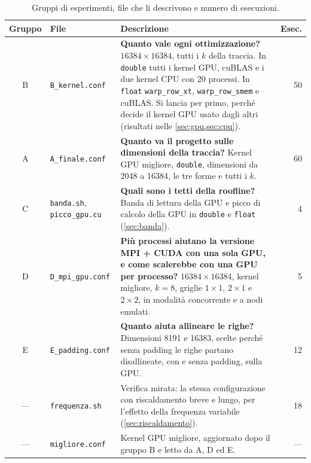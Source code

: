 \documentclass[11pt,a4paper]{article}
\begin{document}
\begin{table}[H]
  \centering
  \small
  \caption{Gruppi di esperimenti, file che li descrivono e numero di esecuzioni.}\label{tab:conf}
  \renewcommand{\arraystretch}{1.25}
  \begin{tabularx}{\textwidth}{|c|l|X|r|}
    \hline
    \textbf{Gruppo} & \textbf{File} & \textbf{Descrizione} & \textbf{Esec.} \\
    \hline
    B & \texttt{B\_kernel.conf} &
      \textbf{Quanto vale ogni ottimizzazione?} $16384 \times 16384$, tutti i
      $k$ della traccia. In \texttt{double} tutti i kernel GPU, cuBLAS e i due
      kernel CPU con 20 processi. In \texttt{float} \texttt{warp\_row\_xt},
      \texttt{warp\_row\_smem} e cuBLAS. Si lancia per primo, perché decide il
      kernel GPU usato dagli altri (risultati nelle \cref{sec:gpu,sec:cpu}). & 50 \\
    \hline
    A & \texttt{A\_finale.conf} &
      \textbf{Quanto va il progetto sulle dimensioni della traccia?} Kernel GPU
      migliore, \texttt{double}, dimensioni da 2048 a 16384, le tre forme e
      tutti i $k$. & 60 \\
    \hline
    C & \texttt{banda.sh}, \texttt{picco\_gpu.cu} &
      \textbf{Quali sono i tetti della roofline?} Banda di lettura della GPU e
      picco di calcolo della GPU in \texttt{double} e \texttt{float}
      (\cref{sec:banda}). & 4 \\
    \hline
    D & \texttt{D\_mpi\_gpu.conf} &
      \textbf{Più processi aiutano la versione MPI + CUDA con una sola GPU, e
      come scalerebbe con una GPU per processo?} $16384 \times 16384$, kernel migliore,
      $k = 8$, griglie $1 \times 1$, $2 \times 1$ e $2 \times 2$, in modalità
      concorrente e a nodi emulati. & 5 \\
    \hline
    E & \texttt{E\_padding.conf} &
      \textbf{Quanto aiuta allineare le righe?} Dimensioni 8191 e 16383, scelte
      perché senza padding le righe partano disallineate, con e senza padding,
      sulla GPU. & 12 \\
    \hline
    --- & \texttt{frequenza.sh} &
      Verifica mirata: la stessa configurazione con riscaldamento breve e lungo,
      per l'effetto della frequenza variabile (\cref{sec:riscaldamento}). & 18 \\
    \hline
    --- & \texttt{migliore.conf} &
      Kernel GPU migliore, aggiornato dopo il gruppo B e letto da A, D ed E. & --- \\
    \hline
  \end{tabularx}
\end{table}
\end{document}
